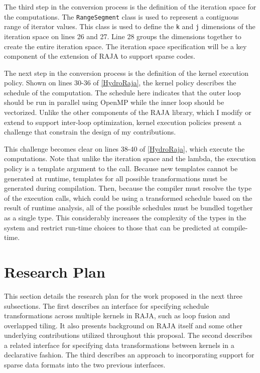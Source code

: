 \documentclass{article}
\begin{document}
The third step in the conversion process is the definition of the iteration space for the computations.
The \verb.RangeSegment. class is used to represent a contiguous range of iterator values.
This class is used to define the \verb.k. and \verb.j. dimensions of the iteration space on lines 26 and 27. 
Line 28 groups the dimensions together to create the entire iteration space.
The iteration space specification will be a key component of the extension of RAJA to support sparse codes.

The next step in the conversion process is the definition of the kernel execution policy. 
Shown on lines 30-36 of \autoref{HydroRaja}, the kernel policy describes the schedule of the computation. 
The schedule here indicates that the outer loop should be run in parallel using OpenMP while the inner loop should be vectorized. 
Unlike the other components of the RAJA library, which I modify or extend to support inter-loop optimization, kernel execution policies present a challenge that constrain the design of my contributions.

This challenge becomes clear on lines 38-40 of \autoref{HydroRaja}, which execute the computations.
Note that unlike the iteration space and the lambda, the execution policy is a template argument to the call.
Because new templates cannot be generated at runtime, templates for all possible transformations must be generated during compilation.
Then, because the compiler must resolve the type of the execution calls, which could be using a transformed schedule based on the result of runtime analysis, all of the possible schedules must be bundled together as a single type.
This considerably increases the complexity of the types in the system and restrict run-time choices to those that can be predicted at compile-time.

\section{Research Plan}
\label{Sec:Plan}
This section details the research plan for the work proposed in the next three subsections. 
The first describes an interface for specifying schedule transformations across multiple kernels in RAJA, such as loop fusion and overlapped tiling. 
It also presents background on RAJA itself and some other underlying contributions utilized throughout this proposal.
The second describes a related interface for specifying data transformations between kernels in a declarative fashion. 
The third describes an approach to incorporating support for sparse data formats into the two previous interfaces. 
\end{document}
